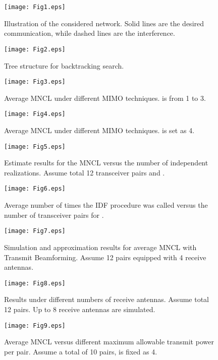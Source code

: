 \documentclass[draftcls,onecolumn,peerview,12pt]{IEEEtran}
\begin{document}
\begin{figure}
\centering
\texttt{[image: Fig1.eps]}
\caption{Illustration of the considered network. Solid lines are the
desired communication, while dashed lines are the interference.}
\label{Fig1}
\end{figure}

\begin{figure}
\centering
\texttt{[image: Fig2.eps]}
\caption{Tree structure for backtracking search.} \label{Fig2}
\end{figure}

\begin{figure}
\centering
\texttt{[image: Fig3.eps]}
\caption{Average MNCL under different MIMO techniques.  is from 1
to 3.} \label{Fig3}
\end{figure}

\begin{figure}
\centering
\texttt{[image: Fig4.eps]}
\caption{Average MNCL under different MIMO techniques.  is set as
4.} \label{Fig4}
\end{figure}

\begin{figure}
\centering
\texttt{[image: Fig5.eps]}
\caption{Estimate results for the MNCL versus the number of
independent realizations. Assume total 12 transceiver pairs and
.} \label{Fig5}
\end{figure}

\begin{figure}
\centering
\texttt{[image: Fig6.eps]}
\caption{Average number of times the IDF procedure was called versus
the number of transceiver pairs for .} \label{Fig6}
\end{figure}

\begin{figure}
\centering
\texttt{[image: Fig7.eps]}
\caption{Simulation and approximation results for average MNCL with
Transmit Beamforming. Assume 12 pairs equipped with 4 receive
antennas.} \label{Fig7}
\end{figure}

\begin{figure}
\centering
\texttt{[image: Fig8.eps]}
\caption{Results under different numbers of receive antennas. Assume
total 12 pairs. Up to 8 receive antennas are simulated.}
\label{Fig8}
\end{figure}

\begin{figure}
\centering
\texttt{[image: Fig9.eps]}
\caption{Average MNCL versus different maximum allowable transmit
power per pair. Assume a total of 10 pairs,  is fixed as 4.}
\label{Fig9}
\end{figure}
\end{document}
